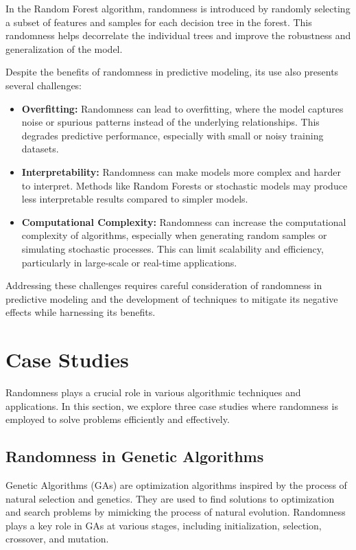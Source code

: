 \documentclass[12pt]{book} %
\begin{document}
In the Random Forest algorithm, randomness is introduced by randomly selecting a subset of features and samples for each decision tree in the forest. This randomness helps decorrelate the individual trees and improve the robustness and generalization of the model.

Despite the benefits of randomness in predictive modeling, its use also presents several challenges:

\begin{itemize}
    \item \textbf{Overfitting:} Randomness can lead to overfitting, where the model captures noise or spurious patterns instead of the underlying relationships. This degrades predictive performance, especially with small or noisy training datasets.
    
    \item \textbf{Interpretability:} Randomness can make models more complex and harder to interpret. Methods like Random Forests or stochastic models may produce less interpretable results compared to simpler models.
    
    \item \textbf{Computational Complexity:} Randomness can increase the computational complexity of algorithms, especially when generating random samples or simulating stochastic processes. This can limit scalability and efficiency, particularly in large-scale or real-time applications.
\end{itemize}

Addressing these challenges requires careful consideration of randomness in predictive modeling and the development of techniques to mitigate its negative effects while harnessing its benefits.



\section{Case Studies}

Randomness plays a crucial role in various algorithmic techniques and applications. In this section, we explore three case studies where randomness is employed to solve problems efficiently and effectively.

\subsection{Randomness in Genetic Algorithms}

Genetic Algorithms (GAs) are optimization algorithms inspired by the process of natural selection and genetics. They are used to find solutions to optimization and search problems by mimicking the process of natural evolution. Randomness plays a key role in GAs at various stages, including initialization, selection, crossover, and mutation.
\end{document}
